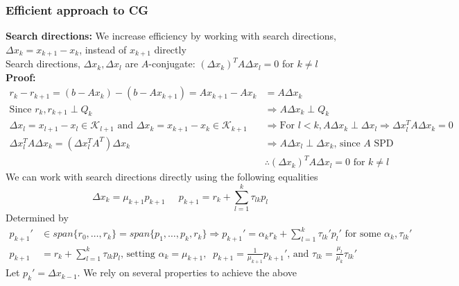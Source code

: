 \documentclass{article}
\begin{document}
\subsubsection{Efficient approach to CG}
\textbf{Search directions:} We increase efficiency by working with search directions, $\Delta x_k = x_{k+1} - x_k$, instead of $x_{k+1}$ directly\\
Search directions, $\Delta x_k, \Delta x_l$ are $A$-conjugate: $(\Delta x_k)^TA\Delta x_l = 0$ for $k \neq l$\\
\textbf{Proof:}
\begin{align*}
    r_k - r_{k+1} = (b - Ax_k) - (b - Ax_{k+1}) = Ax_{k+1} - Ax_k &= A \Delta x_k \\
    \textrm{Since } r_k, r_{k+1} \perp Q_k &\Longrightarrow A \Delta x_k \perp Q_k\\
    \Delta x_l = x_{l+1} - x_l \in \mathcal{K}_{l+1} \textrm{ and } \Delta x_k = x_{k+1} - x_k \in \mathcal{K}_{k+1} &\Longrightarrow \textrm{For } l < k, A\Delta x_k\perp \Delta x_l \Rightarrow \Delta x_l^TA\Delta x_k = 0\\
    \Delta x_l^TA\Delta x_k = (\Delta x_l^TA^T)\Delta x_k &\Longrightarrow A\Delta x_l\perp \Delta x_k \textrm{, since $A$ SPD}\\
    &\therefore (\Delta x_k)^TA\Delta x_l = 0 \textrm{ for } k \neq l
\end{align*}
We can work with search directions directly using the following equalities
\begin{equation*}
    \Delta x_k = \mu_{k+1}p_{k+1} \;\;\;\;\; p_{k+1} = r_k + \sum_{l=1}^k\tau_{lk}p_l
\end{equation*}
Determined by
\begin{align*}
    p_{k+1}' &\in span\{r_0, \dots, r_k\} = span\{p_1, \dots, p_k, r_k\} \Longrightarrow p_{k+1}' = \alpha_kr_k + \sum_{l=1}^k \tau_{lk}'p_l' \textrm{ for some } \alpha_k, \tau_{lk}'\\
    p_{k+1} &= r_k + \sum_{l=1}^k \tau_{lk}p_l \textrm{, setting } \alpha_k = \mu_{k+1}, \;\;  p_{k+1} = \frac{1}{\mu_{k+1}}p_{k+1}' \textrm{, and } \tau_{lk} = \frac{\mu_l}{\mu_k}\tau_{lk}'
\end{align*}
Let $p_k' = \Delta x_{k-1}$. We rely on several properties to achieve the above\\
\end{document}
